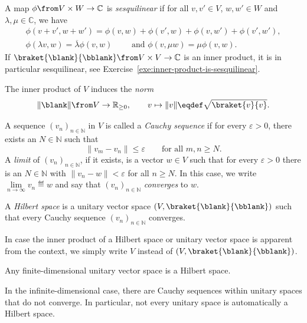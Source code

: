 \documentclass[a4paper,oneside, 12pt]{amsart}
\begin{document}
\begin{remark}\label{rmk:sesquilinear}
  A map \(\phi \from V \times W \to \mathbb{C}\) is \emph{sesquilinear} if for all \(v, v' \in V\), \(w, w' \in W\) and \(\lambda, \mu \in \mathbb{C}\), we have
  \begin{gather*}
    \phi(v+v', w+ w') = \phi(v,w) + \phi(v',w) + \phi(v, w') + \phi(v',w'), \\
    \phi(\lambda v, w) = \overline{\lambda} \phi(v, w) \qquad \text{ and } \phi(v, \mu w) = \mu \phi(v,w).
  \end{gather*}
  If \(\braket{\blank}{\bblank} \from V\times V \to \mathbb{C}\) is an inner product, it is in particular sesquilinear, see Exercise~\ref{exe:inner-product-is-sesquilinear}.
\end{remark}



The inner product of \(V\) induces the \emph{norm}
\begin{equation}
  \| \blank \| \from V \to \mathbb{R}_{\geq0} ,\qquad   v \mapsto \|v\| \eqdef  \sqrt{\braket{v}{v}}.
\end{equation}

A sequence \((v_n)_{n \in \mathbb{N}}\) in \( V \) is called a \emph{Cauchy sequence} if for every \(\varepsilon > 0\), there exists an \(N \in \mathbb{N}\) such that
\begin{equation}
  \|v_m - v_n\| \leq \varepsilon \qquad \text{for all } m, n \geq N.
\end{equation}
A \emph{limit} of \((v_{n})_{n\in \mathbb{N}}\), if it exists, is a vector \(w \in V\) such that for every \(\varepsilon>0\) there is an \(N\in \mathbb{N}\) with
\(\|v_{n}- w\|< \varepsilon\) for all \(n \geq N\).
In this case,  we write \(\lim\limits_{n\to \infty} v_{n} \eqdef w\) and say that \((v_{n})_{n\in \mathbb{N}}\) \emph{converges} to \(w\).

\begin{definition}\label{def:Hilbert-space}
  A \emph{Hilbert space} is a unitary vector space \((V, \braket{\blank}{\bblank})\) such that
  every Cauchy sequence \((v_{n})_{n\in \mathbb{N}}\) converges.
\end{definition}

In case the inner product of a Hilbert space or unitary vector space is apparent from the context, we simply write \(V\) instead of \((V, \braket{ \blank }{\bblank})\).

\begin{proposition}\label{prop:fin-dim-implies-Hilbert}
  Any finite-dimensional unitary vector space is a Hilbert space.
\end{proposition}
In the infinite-dimensional case, there are Cauchy sequences within  unitary spaces that do not converge.
In particular, not every unitary space is automatically a Hilbert space.
\end{document}
